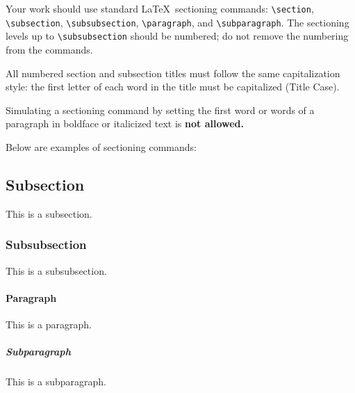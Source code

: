 \documentclass[sigconf]{acmart}
\begin{document}
Your work should use standard \LaTeX\ sectioning commands:
\verb|\section|, \verb|\subsection|, \verb|\subsubsection|,
\verb|\paragraph|, and \verb|\subparagraph|. The sectioning levels up to
\verb|\subsubsection| should be numbered; do not remove the numbering
from the commands.

All numbered section and subsection titles must follow the same capitalization style: the first letter of each word in the title must be capitalized (Title Case).

Simulating a sectioning command by setting the first word or words of a paragraph in boldface or italicized text is {\bfseries not allowed.}

Below are examples of sectioning commands:

\subsection{Subsection}
\label{sec:subsection}

This is a subsection.

\subsubsection{Subsubsection}
\label{sec:subsubsection}

This is a subsubsection.

\paragraph{Paragraph}

This is a paragraph.

\subparagraph{Subparagraph}

This is a subparagraph.
\end{document}
